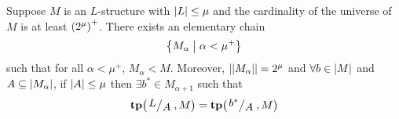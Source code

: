 \begin{boxlemma}\label{Ch2:Lemma:ErdRad_Intermediate}
    Suppose $M$ is an $L$-structure with $\left\lvert L \right\rvert \leq \mu$ and the cardinality of the universe of $M$ is at least $\left( 2^{\mu} \right)^+$. There exists an elementary chain
    \begin{align*}
        \left\{ M_{\alpha} \; \middle\vert \; \alpha < \mu^{+} \right\}
    \end{align*}
    such that for all $\alpha < \mu^{+}$, $M_{\alpha} < M$. Moreover, $\left\lvert \left\lvert M_{\alpha} \right\rvert \right\rvert = 2^{\mu}$ and $\forall b \in \left\lvert M \right\rvert$ and $A \subseteq \left\lvert M_{\alpha} \right\rvert$, if $\left\lvert A \right\rvert \leq \mu$ then $\exists b^* \in M_{\alpha + 1}$ such that
    \begin{align*}
        \tp\of{\quotient{L}{A}, M} = \tp\of{\quotient{b^*}{A}, M}
    \end{align*}
\end{boxlemma}

